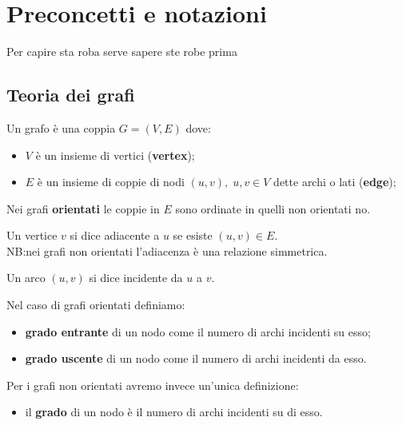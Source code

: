 \section{Preconcetti e notazioni}
Per capire sta roba serve sapere ste robe prima

\subsection{Teoria dei grafi}
\begin{definizione}[Grafo]
    Un grafo è una coppia \(G=(V,E)\) dove:
    \begin{itemize}
        \item \(V\) è un insieme di vertici (\textbf{vertex});
        \item \(E\) è un insieme di coppie di nodi \((u,v),\;u,v\in V\) dette archi o lati (\textbf{edge});
    \end{itemize}
    Nei grafi \textbf{orientati} le coppie in \(E\) sono ordinate in quelli non orientati no.
\end{definizione}

\begin{definizione}[Adiacenza]
    Un vertice \(v\) si dice adiacente a \(u\) se esiste \((u,v) \in E\). \\
    NB:\@ nei grafi non orientati l'adiacenza è una relazione simmetrica.
\end{definizione}

\begin{definizione}
    Un arco \((u,v)\) si dice incidente da \(u\) a \(v\).
\end{definizione}

\begin{definizione}[Grado]
    Nel caso di grafi orientati definiamo:
    \begin{itemize}
        \item \textbf{grado entrante} di un nodo come il numero di archi incidenti su esso;
        \item \textbf{grado uscente} di un nodo come il numero di archi incidenti da esso.
    \end{itemize}
    Per i grafi non orientati avremo invece un'unica definizione:
    \begin{itemize}
        \item il \textbf{grado} di un nodo è il numero di archi incidenti su di esso.
    \end{itemize}
\end{definizione}

